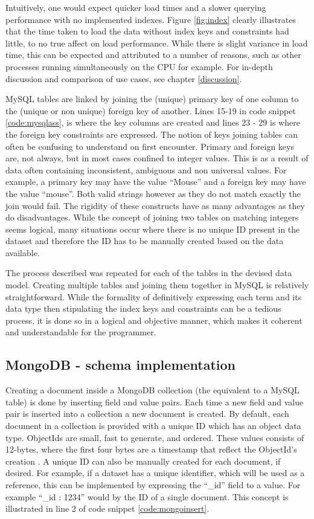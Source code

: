 Intuitively, one would expect quicker load times and a slower querying performance with no implemented indexes. Figure \ref{fig:index} clearly illustrates that the time taken to load the data without index keys and constraints had little, to no true affect on load performance. While there is slight variance in load time, this can be expected and attributed to a number of reasons, such as other processes running simultaneously on the CPU for example. For in-depth discussion and comparison of use cases, see chapter \ref{discussion}.

MySQL tables are linked by joining the (unique) primary key of one column to the (unique or non unique) foreign key of another. Lines 15-19 in code snippet \ref{code:mysqlass}, is where the key columns are created and lines 23 - 29 is where the foreign key constraints are expressed. The notion of keys joining tables can often be confusing to understand on first encounter. Primary and foreign keys are, not always, but in most cases confined to integer values. This is as a result of data often containing inconsistent, ambiguous and non universal values. For example, a primary key may have the value ``Mouse'' and a foreign key may have the value ``mouse''. Both valid strings however as they do not match exactly the join would fail. The rigidity of these constructs have as many advantages as they do disadvantages. While the concept of joining two tables on matching integers seems logical, many situations occur where there is no unique ID present in the dataset and therefore the ID has to be manually created based on the data available.

The process described was repeated for each of the tables in the devised data model. Creating multiple tables and joining them together in MySQL is relatively straightforward. While the formality of definitively expressing each term and its data type then stipulating the index keys and constraints can be a tedious process, it is done so in a logical and objective manner, which makes it coherent and understandable for the programmer.

\subsection{MongoDB - schema implementation}\label{mongocreate}
Creating a document inside a MongoDB collection (the equivalent to a MySQL table) is done by inserting field and value pairs. Each time a new field and value pair is inserted into a collection a new document is created. By default, each document in a collection is provided with a unique ID which has an object data type. ObjectIds are small, fast to generate, and ordered. These values consists of 12-bytes, where the first four bytes are a timestamp that reflect the ObjectId’s creation \cite{mongo}. A unique ID can also be manually created for each document, if desired. For example, if a dataset has a unique identifier, which will be used as a reference, this can be implemented by expressing the ``\_id'' field to a value. For example ``\_id : 1234'' would by the ID of a single document. This concept is illustrated in line 2 of code snippet \ref{code:mongoinsert}.

